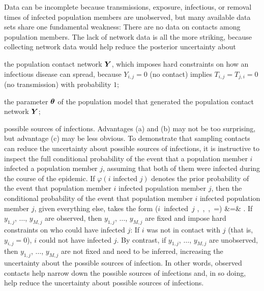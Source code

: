 Data can be incomplete because transmissions, exposure, infectious, or removal times of infected population members are unobserved,
but many available data sets share one fundamental weakness:
There are no data on contacts among population members.
The lack of network data is all the more striking,
because collecting network data would help reduce the posterior uncertainty about
\bi
\item[(a)] the population contact network $\bm{Y}$,
which imposes hard constraints on how an infectious disease can spread,
because 
$Y_{i,j}=0$ (no contact) implies  $T_{i,j} = T_{j,i} = 0$ (no transmission) with probability $1$;
\item[(b)] the parameter $\boldsymbol{\theta}$ of the population model that generated the population contact network $\bm{Y}$;
\item[(c)] possible sources of infections.
\ei
Advantages (a) and (b) may not be too surprising,
but advantage (c) may be less obvious.
To demonstrate that sampling contacts can reduce the uncertainty about possible sources of infections,
it is instructive to inspect the full conditional probability of the event that a population member $i$ infected a population member $j$,
assuming that both of them were infected during the course of the epidemic.
If $\varphi(\mbox{$i$ infected $j$})$ denotes the prior probability of the event that population member $i$ infected population member $j$,
then the conditional probability of the event that population member $i$ infected population member $j$,
given everything else, 
takes the form
\bea
\nonumber
\mbP(\mbox{$i$ infected $j$} \mid \bE,\, \bI,\, \bR,\, \bY=\by)
&=& .
\eea
If $y_{1,j}$, $\dots$, $y_{M,j}$ are observed,
then $y_{1,j}$, $\dots$, $y_{M,j}$ are fixed and impose hard constraints on who could have infected $j$:
If $i$ was not in contact with $j$ (that is, $y_{i,j}=0$),
$i$ could not have infected $j$.
By contrast,
if $y_{1,j}$, $\dots$, $y_{M,j}$ are unobserved,
then $y_{1,j}$, $\dots$, $y_{M,j}$ are not fixed and need to be inferred,
increasing the uncertainty about the possible sources of infection.
In other words,
observed contacts help narrow down the possible sources of infections and, in so doing, help reduce the uncertainty about possible sources of infections.
